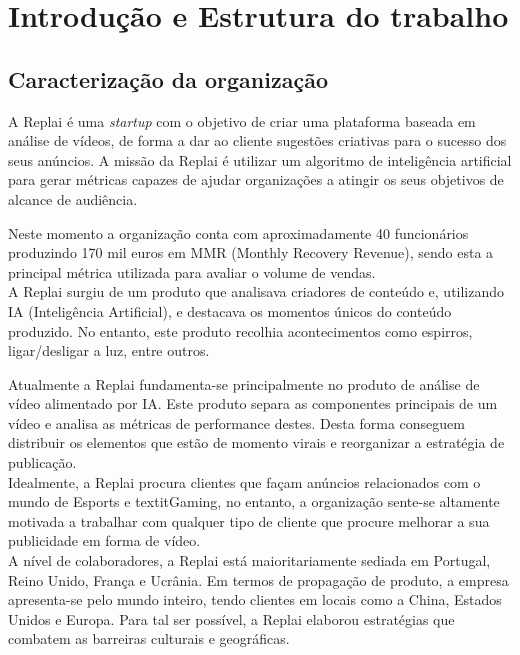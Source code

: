 \chapter{Introdução e Estrutura do trabalho}
\section{Caracterização da organização}

A Replai é uma \textit{startup} com o objetivo de criar uma plataforma baseada em análise de vídeos, de forma a dar ao cliente sugestões criativas para o sucesso dos seus anúncios. 
A missão da Replai é utilizar um algoritmo de inteligência artificial para gerar métricas capazes de ajudar organizações a atingir os seus objetivos de alcance de audiência.

Neste momento a organização conta com aproximadamente 40 funcionários produzindo 170 mil euros em MMR (Monthly Recovery Revenue), sendo esta a principal métrica utilizada para avaliar o volume de vendas.\\

A Replai surgiu de um produto que analisava criadores de conteúdo e, utilizando IA (Inteligência Artificial), e destacava os momentos únicos do conteúdo produzido. No entanto, este produto recolhia acontecimentos como espirros, ligar/desligar a luz, entre outros.

Atualmente a Replai fundamenta-se principalmente no produto de análise de vídeo alimentado por IA. 
Este produto separa as componentes principais de um vídeo e analisa as métricas de performance destes. Desta forma conseguem distribuir os elementos que estão de momento virais e reorganizar a estratégia de publicação.\\

Idealmente, a Replai procura clientes que façam anúncios relacionados com o mundo de Esports e textit{Gaming}, no entanto, a organização sente-se altamente motivada a trabalhar com qualquer tipo de cliente que procure melhorar a sua publicidade em forma de vídeo. \\

A nível de colaboradores, a Replai está maioritariamente sediada em Portugal, Reino Unido, França e Ucrânia.
Em termos de propagação de produto, a empresa apresenta-se pelo mundo inteiro, tendo clientes em locais como a China, Estados Unidos e Europa. Para tal ser possível, a Replai elaborou estratégias que combatem as barreiras culturais e geográficas. 

\newpage


